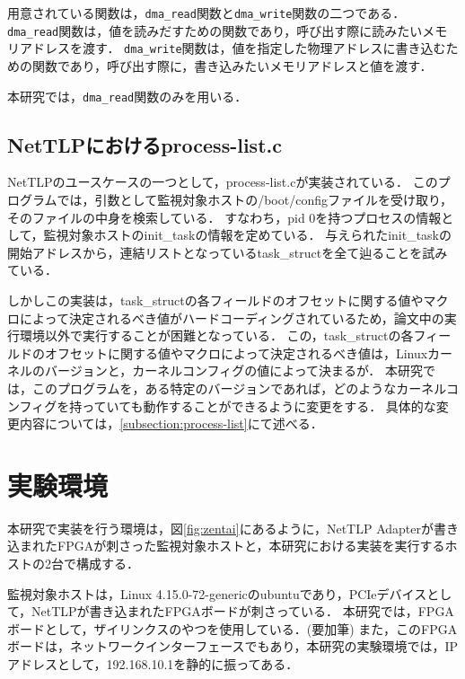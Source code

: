 用意されている関数は，\verb|dma_read|関数と\verb|dma_write|関数の二つである．
\verb|dma_read|関数は，値を読みだすための関数であり，呼び出す際に読みたいメモリアドレスを渡す．
\verb|dma_write|関数は，値を指定した物理アドレスに書き込むための関数であり，呼び出す際に，書き込みたいメモリアドレスと値を渡す．

本研究では，\verb|dma_read|関数のみを用いる．

\subsection{NetTLPにおけるprocess-list.c}
\label{subsection:upa_process-list}

NetTLP\cite{246316}のユースケースの一つとして，process-list.cが実装されている．
このプログラムでは，引数として監視対象ホストの/boot/configファイルを受け取り，そのファイルの中身を検索している．
すなわち，pid 0を持つプロセスの情報として，監視対象ホストのinit\_taskの情報を定めている．
与えられたinit\_taskの開始アドレスから，連結リストとなっているtask\_structを全て辿ることを試みている．

しかしこの実装は，task\_structの各フィールドのオフセットに関する値やマクロによって決定されるべき値がハードコーディングされているため，論文中の実行環境以外で実行することが困難となっている．
この，task\_structの各フィールドのオフセットに関する値やマクロによって決定されるべき値は，Linuxカーネルのバージョンと，カーネルコンフィグの値によって決まるが．
本研究では，このプログラムを，ある特定のバージョンであれば，どのようなカーネルコンフィグを持っていても動作することができるように変更をする．
具体的な変更内容については，\ref{subsection:process-list}にて述べる．


\section{実験環境}

本研究で実装を行う環境は，図\ref{fig:zentai}にあるように，NetTLP Adapterが書き込まれたFPGAが刺さった監視対象ホストと，本研究における実装を実行するホストの2台で構成する．

監視対象ホストは，Linux 4.15.0-72-genericのubuntuであり，PCIeデバイスとして，NetTLPが書き込まれたFPGAボードが刺さっている．
本研究では，FPGAボードとして，ザイリンクスのやつを使用している．(要加筆)
また，このFPGAボードは，ネットワークインターフェースでもあり，本研究の実験環境では，IPアドレスとして，192.168.10.1を静的に振ってある．

